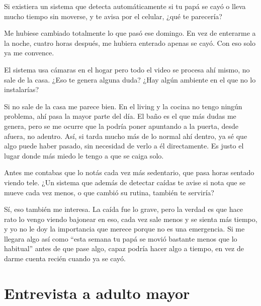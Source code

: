\begin{description}[leftmargin=0cm, labelsep=0.5cm]

    \item[\textbf{Entrevistador:}] Si existiera un sistema que detecta automáticamente si tu papá se cayó o lleva mucho tiempo sin moverse, y te avisa por el celular, ¿qué te parecería?

    \item[\textbf{Entrevistado:}] Me hubiese cambiado totalmente lo que pasó ese domingo.
    En vez de enterarme a la noche, cuatro horas después, me hubiera enterado apenas se cayó.
    Con eso solo ya me convence.

    \item[\textbf{Entrevistador:}] El sistema usa cámaras en el hogar pero todo el video se procesa ahí mismo, no sale de la casa.
    ¿Eso te genera alguna duda?
    ¿Hay algún ambiente en el que no lo instalarías?

    \item[\textbf{Entrevistado:}] Si no sale de la casa me parece bien.
    En el living y la cocina no tengo ningún problema, ahí pasa la mayor parte del día.
    El baño es el que más dudas me genera, pero se me ocurre que la podría poner apuntando a la puerta, desde afuera, no adentro.
    Así, si tarda mucho más de lo normal ahí dentro, ya sé que algo puede haber pasado, sin necesidad de verlo a él directamente.
    Es justo el lugar donde más miedo le tengo a que se caiga solo.

    \item[\textbf{Entrevistador:}] Antes me contabas que lo notás cada vez más sedentario, que pasa horas sentado viendo tele.
    ¿Un sistema que además de detectar caídas te avise si nota que se mueve cada vez menos, o que cambió su rutina, también te serviría?

    \item[\textbf{Entrevistado:}] Sí, eso también me interesa.
    La caída fue lo grave, pero la verdad es que hace rato lo vengo viendo bajonear en eso, cada vez sale menos y se sienta más tiempo, y yo no le doy la importancia que merece porque no es una emergencia.
    Si me llegara algo así como ``esta semana tu papá se movió bastante menos que lo habitual'' antes de que pase algo, capaz podría hacer algo a tiempo, en vez de darme cuenta recién cuando ya se cayó.

\end{description}

\clearpage
\section{Entrevista a adulto mayor}

